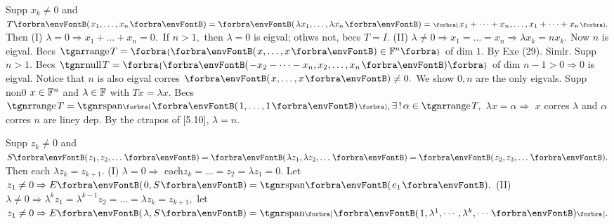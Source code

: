 
Supp $x_k\neq 0$ and $T\Par{x_1,\dots,x_n}=\Par{\lambda x_1,\dots,\lambda x_n}=\BigPar{x_1+\dots+x_n,\dots,x_1+\dots+x_n}.$\parSol{}
Then (I) $\lambda=0\Rightarrow x_1+\dots+x_n=0.$ \,If $n>1,$ then $\lambda=0$ is eigval; othws not, becs $T=I.$\parSol{}
(II) $\lambda\neq 0\Rightarrow x_1=\dots=x_n\Rightarrow\lambda x_k=n x_k.$ Now $n$ is eigval.\PfEnd\vspace{2pt}\parSol{}
\Or Becs $\range T=\Bra{\Par{x,\dots,x}\in\Fbb^n}$ of dim $1.$ By Exe (29). Simlr.\PfEnd\parSol{}
\Or Supp $n>1.$ Becs $\null T=\Bra{\Par{{-x_2-\dots-x_n,x_2,\dots,x_n}}}$ of dim $n-1>0\Rightarrow 0$ is eigval.\parSol{}
Notice that $n$ is also eigval corres $\Par{x,\dots,x}\neq 0.$ We show $0,n$ are the only eigvals.\parSol{}
Supp non0 $x\in{\mathbb{F}}^n$ and $\lambda\in{\mathbb{F}}$ with $Tx=\lambda x.$ Becs $\range T=\Span[\BigPar]{\Par{1,\dots,1}},\exists\,!\,\alpha\in\range T,$\parSol{}
$\lambda x=\alpha\Rightarrow$ $x$ corres $\lambda$ and $\alpha$ corres $n$ are liney dep. By the ctrapos of [5.10], $\lambda=n.$\PfEnd
\SepLine\pagebreak

Supp $z_k\neq 0$ and $S\Par{z_1,z_2,\dots}=\Par{\lambda z_1,\lambda z_2,\dots}=\Par{z_2,z_3,\dots}.$ Then each $\lambda z_k=z_{k+1}.$\parSol{}
(I) $\lambda=0\Rightarrow$ each$z_k=\dots=z_2=\lambda z_1=0.$ Let $z_1\neq0\Rightarrow E\Par{0,S}=\Span{e_1}.$\parSol{}
(II) $\lambda\neq 0\Rightarrow\lambda^k z_1=\lambda^{k-1} z_2=\dots=\lambda z_k=z_{k+1},$ let $z_1\neq 0\Rightarrow E\Par{\lambda,S}=\Span[\Sbra]{\Par{1,\lambda^1,\cdots,\lambda^k,\cdots}}.$\PfEnd
\SepLine


